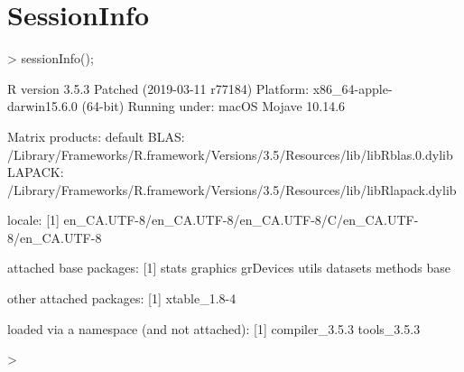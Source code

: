 \documentclass{article}
\begin{document}
\newpage
\section{SessionInfo}

\begin{Schunk}
\begin{Sinput}
> sessionInfo();
\end{Sinput}
\begin{Soutput}
R version 3.5.3 Patched (2019-03-11 r77184)
Platform: x86_64-apple-darwin15.6.0 (64-bit)
Running under: macOS Mojave 10.14.6

Matrix products: default
BLAS: /Library/Frameworks/R.framework/Versions/3.5/Resources/lib/libRblas.0.dylib
LAPACK: /Library/Frameworks/R.framework/Versions/3.5/Resources/lib/libRlapack.dylib

locale:
[1] en_CA.UTF-8/en_CA.UTF-8/en_CA.UTF-8/C/en_CA.UTF-8/en_CA.UTF-8

attached base packages:
[1] stats     graphics  grDevices utils     datasets  methods   base     

other attached packages:
[1] xtable_1.8-4

loaded via a namespace (and not attached):
[1] compiler_3.5.3 tools_3.5.3   
\end{Soutput}
\begin{Sinput}
> 
\end{Sinput}
\end{Schunk}
\end{document}
